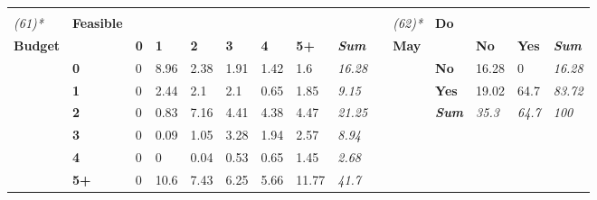 {\begin{center}
\begin{longtable}{lllllllllllllll}
  \textit{} &
  \textit{} &
  \textit{} &
  \textit{} &
  \textit{} \\
\textit{(61)*} &
  \textbf{Feasible} &
   &
   &
   &
   &
   &
   &
  \textit{} &
   &
  \textit{(62)*} &
  \textbf{Do} &
   &
   &
  \textit{} \\
\textbf{Budget} &
   &
  \textbf{0} &
  \textbf{1} &
  \textbf{2} &
  \textbf{3} &
  \textbf{4} &
  \textbf{5+} &
  \textit{\textbf{Sum}} &
  \textbf{} &
  \textbf{May} &
   &
  \textbf{No} &
  \textbf{Yes} &
  \textit{\textbf{Sum}} \\
 &
  \textbf{0} &
  \cellcolor[HTML]{FFFFFF}0 &
  \cellcolor[HTML]{BCBCBC}8.96 &
  \cellcolor[HTML]{EEEEEE}2.38 &
  \cellcolor[HTML]{F1F1F1}1.91 &
  \cellcolor[HTML]{F5F5F5}1.42 &
  \cellcolor[HTML]{F3F3F3}1.6 &
  \textit{16.28} &
   &
   &
  \textbf{No} &
  \cellcolor[HTML]{E9E9E9}16.28 &
  \cellcolor[HTML]{FFFFFF}0 &
  \textit{16.28} \\
 &
  \textbf{1} &
  \cellcolor[HTML]{FFFFFF}0 &
  \cellcolor[HTML]{EDEDED}2.44 &
  \cellcolor[HTML]{F0F0F0}2.1 &
  \cellcolor[HTML]{F0F0F0}2.1 &
  \cellcolor[HTML]{FBFBFB}0.65 &
  \cellcolor[HTML]{F2F2F2}1.85 &
  \textit{9.15} &
   &
   &
  \textbf{Yes} &
  \cellcolor[HTML]{E5E5E5}19.02 &
  \cellcolor[HTML]{A6A6A6}64.7 &
  \textit{83.72} \\
 &
  \textbf{2} &
  \cellcolor[HTML]{FFFFFF}0 &
  \cellcolor[HTML]{F9F9F9}0.83 &
  \cellcolor[HTML]{C9C9C9}7.16 &
  \cellcolor[HTML]{DEDEDE}4.41 &
  \cellcolor[HTML]{DEDEDE}4.38 &
  \cellcolor[HTML]{DEDEDE}4.47 &
  \textit{21.25} &
   &
   &
  \textit{\textbf{Sum}} &
  \textit{35.3} &
  \textit{64.7} &
  \textit{100} \\
 &
  \textbf{3} &
  \cellcolor[HTML]{FFFFFF}0 &
  \cellcolor[HTML]{FFFFFF}0.09 &
  \cellcolor[HTML]{F8F8F8}1.05 &
  \cellcolor[HTML]{E7E7E7}3.28 &
  \cellcolor[HTML]{F1F1F1}1.94 &
  \cellcolor[HTML]{ECECEC}2.57 &
  \textit{8.94} &
   &
   &
   &
   &
   &
  \textit{} \\
 &
  \textbf{4} &
  \cellcolor[HTML]{FFFFFF}0 &
  \cellcolor[HTML]{FFFFFF}0 &
  \cellcolor[HTML]{FFFFFF}0.04 &
  \cellcolor[HTML]{FBFBFB}0.53 &
  \cellcolor[HTML]{FBFBFB}0.65 &
  \cellcolor[HTML]{F5F5F5}1.45 &
  \textit{2.68} &
   &
   &
   &
   &
   &
  \textit{} \\
 &
  \textbf{5+} &
  \cellcolor[HTML]{FFFFFF}0 &
  \cellcolor[HTML]{AFAFAF}10.6 &
  \cellcolor[HTML]{C7C7C7}7.43 &
  \cellcolor[HTML]{D0D0D0}6.25 &
  \cellcolor[HTML]{D5D5D5}5.66 &
  \cellcolor[HTML]{A6A6A6}11.77 &
  \textit{41.7} &
   &
   &
   &
   &
   &
  \textit{} \\

\end{longtable}
\end{center}}
